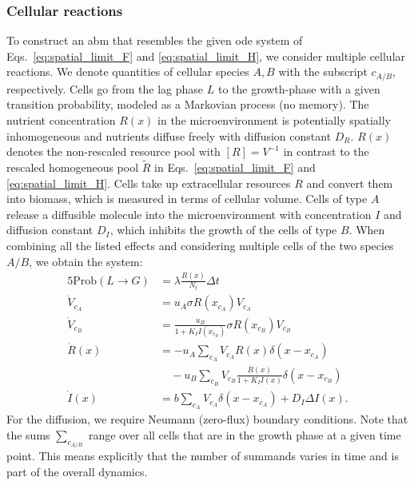 \documentclass[10pt,1p,authoryear]{elsarticle}
\numberwithin{equation}{section}
\begin{document}
\subsubsection{Cellular reactions}
To construct an \ac{abm} that resembles the given \ac{ode} system of Eqs.~\eqref{eq:spatial_limit_F} and \eqref{eq:spatial_limit_H}, we consider multiple cellular reactions.
We denote quantities of cellular species $A,B$ with the subscript $c_{A/B}$, respectively. Cells go from the lag phase $L$ to the growth-phase with a given transition probability, modeled as a Markovian process (no memory). The nutrient concentration $R(x)$ in the microenvironment is potentially spatially inhomogeneous and nutrients diffuse freely with diffusion constant $D_R$. $R(x)$ denotes the non-rescaled resource pool with $[R]=V^{-1}$ in contrast to the rescaled homogeneous pool $\tilde{R}$ in Eqs.~\eqref{eq:spatial_limit_F} and \eqref{eq:spatial_limit_H}. 
Cells take up extracellular resources $R$ and convert them into biomass, which is measured in terms of cellular volume.
Cells of type $A$ release a diffusible molecule into the microenvironment with concentration $I$ and diffusion constant $D_I$, which inhibits the growth of the cells of type $B$.
When combining all the listed effects and considering multiple cells of the two species $A/B$, we obtain the system:
\begin{alignat}{5}
	\text{Prob}(L\to G) &= \lambda \frac{R(x)}{N_t}\Delta t\\
    \dot{V}_{c_A} &= u_A \sigma R(x_{c_A})V_{c_A}
    \label{eq:spatial-full-system-simplified-begin}\\
    \dot{V}_{c_B} &= \frac{u_B}{1+K_I I(x_{c_B})} \sigma R(x_{c_B}) V_{c_B}\\
    \dot{R}(x) &= -u_A \sum\limits_{c_A}V_{c_A} R(x) \delta(x-x_{c_A})\\
        &\quad- u_B \sum\limits_{c_B}V_{c_B}\frac{R(x) }{1+ K_I I(x)}\delta(x-x_{c_B})\nonumber\\
    \dot{I}(x) &=b\sum\limits_{c_A} V_{c_A}\delta(x-x_{c_A}) + D_I\Delta I(x).
    \label{eq:spatial-full-system-simplified-end}
\end{alignat}
For the diffusion, we require Neumann (zero-flux) boundary conditions.
Note that the sums $\sum_{c_{A/B}}$ range over all cells that are in the growth phase at a given time point. This means explicitly that the number of summands varies in time and is part of the overall dynamics.
%
\end{document}
